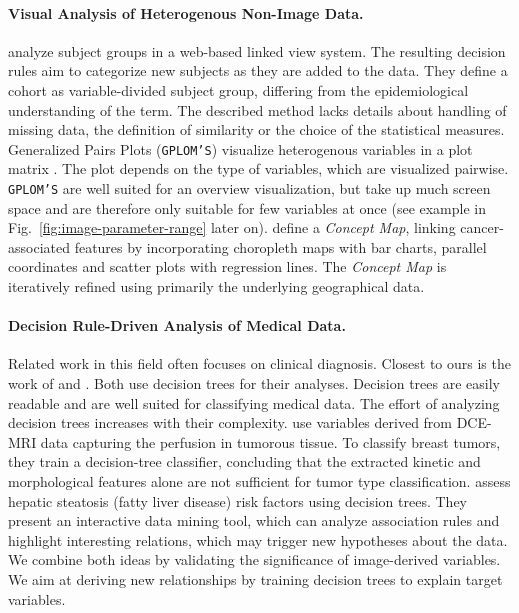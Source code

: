 \documentclass[a4paper,twoside]{style/article}
\begin{document}
\paragraph{Visual Analysis of Heterogenous Non-Image Data.}
\cite{Zhang} analyze subject groups in a web-based linked view system.
The resulting decision rules aim to categorize new subjects as they are added to the data.
They define a cohort as variable-divided subject group, differing from the epidemiological understanding of the term.
The described method lacks details about handling of missing data, the definition of similarity or the choice of the statistical measures.
Generalized Pairs Plots (\texttt{GPLOM'S}) visualize heterogenous variables in a plot matrix \cite{GPLOMS,Francois}.
The plot depends on the type of variables, which are visualized pairwise.
\texttt{GPLOM'S} are well suited for an overview visualization, but take up much screen space and are therefore only suitable for few variables at once (see example in Fig.~\ref{fig:image-parameter-range} later on).
\cite{Dai} define a \emph{Concept Map}, linking cancer-associated features by incorporating choropleth maps with bar charts, parallel coordinates and scatter plots with regression lines.
The \emph{Concept Map} is iteratively refined using primarily the underlying geographical data.
\paragraph{Decision Rule-Driven Analysis of Medical Data.}
Related work in this field often focuses on clinical diagnosis.
Closest to ours is the work of \cite{Glasser2013} and \cite{Niemann2014}.
Both use decision trees for their analyses.
Decision trees are easily readable and are well suited for classifying medical data.
The effort of analyzing decision trees increases with their complexity.
\cite{Glasser2013} use variables derived from DCE-MRI data capturing the perfusion in tumorous tissue.
To classify breast tumors, they train a decision-tree classifier, concluding that the extracted kinetic and morphological features alone are not sufficient for tumor type classification.
\cite{Niemann2014} assess hepatic steatosis (fatty liver disease) risk factors using decision trees.
They present an interactive data mining tool, which can analyze association rules and highlight interesting relations, which may trigger new hypotheses about the data.
We combine both ideas by validating the significance of image-derived variables.
We aim at deriving new relationships by training decision trees to explain target variables.
\end{document}
